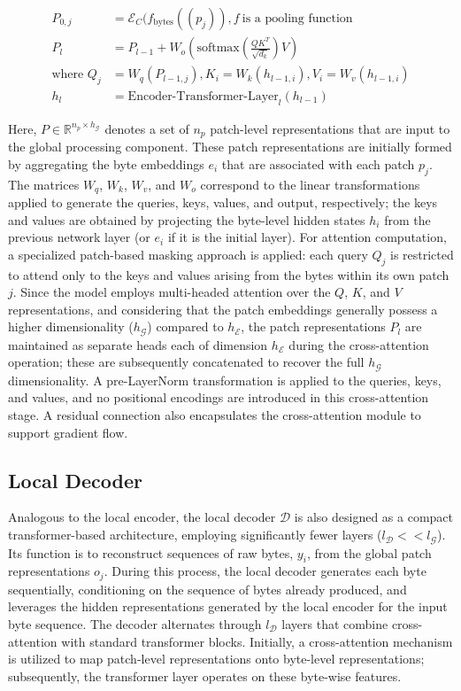 \begin{align}
P_{0,j} &= \mathcal{E}_{C}(f_\text{bytes}((p_j)), f~ \text{is a pooling function} \\
P_l &= P_{l-1} + W_o\left(\text{softmax}\left(\frac{QK^T}{\sqrt{d_k}}\right)V\right) \\
\text{where } Q_j &= W_q(P_{l-1,j}), K_i = W_k(h_{l-1,i}), V_i = W_v(h_{l-1,i}) \\
h_l &= \text{Encoder-Transformer-Layer}_l(h_{l-1})
\end{align}

Here, $P \in \mathbb{R}^{n_p \times h_{\mathcal{G}}}$ denotes a set of $n_p$ patch-level representations that are input to the global processing component. These patch representations are initially formed by aggregating the byte embeddings $e_i$ that are associated with each patch $p_j$. The matrices $W_q$, $W_k$, $W_v$, and $W_o$ correspond to the linear transformations applied to generate the queries, keys, values, and output, respectively; the keys and values are obtained by projecting the byte-level hidden states $h_i$ from the previous network layer (or $e_i$ if it is the initial layer). For attention computation, a specialized patch-based masking approach is applied: each query $Q_j$ is restricted to attend only to the keys and values arising from the bytes within its own patch $j$. Since the model employs multi-headed attention over the $Q$, $K$, and $V$ representations, and considering that the patch embeddings generally possess a higher dimensionality ($h_{\mathcal{G}}$) compared to $h_{\mathcal{E}}$, the patch representations $P_l$ are maintained as separate heads each of dimension $h_{\mathcal{E}}$ during the cross-attention operation; these are subsequently concatenated to recover the full $h_{\mathcal{G}}$ dimensionality. A pre-LayerNorm transformation is applied to the queries, keys, and values, and no positional encodings are introduced in this cross-attention stage. A residual connection also encapsulates the cross-attention module to support gradient flow.

\subsection{Local Decoder} 

Analogous to the local encoder, the local decoder $\mathcal{D}$ is also designed as a compact transformer-based architecture, employing significantly fewer layers ($l_{\mathcal{D}} << l_{\mathcal{G}}$). Its function is to reconstruct sequences of raw bytes, $y_i$, from the global patch representations $o_j$. During this process, the local decoder generates each byte sequentially, conditioning on the sequence of bytes already produced, and leverages the hidden representations generated by the local encoder for the input byte sequence. The decoder alternates through $l_{\mathcal{D}}$ layers that combine cross-attention with standard transformer blocks. Initially, a cross-attention mechanism is utilized to map patch-level representations onto byte-level representations; subsequently, the transformer layer operates on these byte-wise features.

